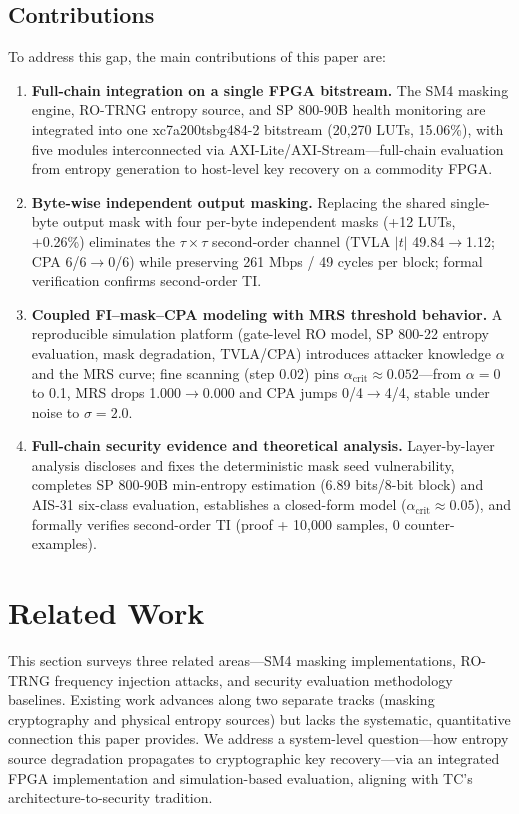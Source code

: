\documentclass[journal]{IEEEtran}
\begin{document}
\subsection{Contributions}

To address this gap, the main contributions of this paper are:

\begin{enumerate}
\item \textbf{Full-chain integration on a single FPGA bitstream.} The SM4 masking engine, RO-TRNG entropy source, and SP 800-90B health monitoring are integrated into one xc7a200tsbg484-2 bitstream (20,270 LUTs, 15.06\%), with five modules interconnected via AXI-Lite/AXI-Stream---full-chain evaluation from entropy generation to host-level key recovery on a commodity FPGA.
\item \textbf{Byte-wise independent output masking.} Replacing the shared single-byte output mask with four per-byte independent masks (+12 LUTs, +0.26\%) eliminates the $\tau\times\tau$ second-order channel (TVLA $|t|$ 49.84$\rightarrow$1.12; CPA 6/6$\rightarrow$0/6) while preserving 261 Mbps / 49 cycles per block; formal verification confirms second-order TI.
\item \textbf{Coupled FI--mask--CPA modeling with MRS threshold behavior.} A reproducible simulation platform (gate-level RO model, SP 800-22 entropy evaluation, mask degradation, TVLA/CPA) introduces attacker knowledge $\alpha$ and the MRS curve; fine scanning (step 0.02) pins $\alpha_{\text{crit}} \approx 0.052$---from $\alpha=0$ to 0.1, MRS drops 1.000$\rightarrow$0.000 and CPA jumps 0/4$\rightarrow$4/4, stable under noise to $\sigma=2.0$.
\item \textbf{Full-chain security evidence and theoretical analysis.} Layer-by-layer analysis discloses and fixes the deterministic mask seed vulnerability, completes SP 800-90B min-entropy estimation (6.89 bits/8-bit block) and AIS-31 six-class evaluation, establishes a closed-form model ($\alpha_{\text{crit}} \approx 0.05$), and formally verifies second-order TI (proof + 10,000 samples, 0 counter-examples).
\end{enumerate}

\section{Related Work}

This section surveys three related areas---SM4 masking implementations, RO-TRNG frequency injection attacks, and security evaluation methodology baselines. Existing work advances along two separate tracks (masking cryptography and physical entropy sources) but lacks the systematic, quantitative connection this paper provides. We address a system-level question---how entropy source degradation propagates to cryptographic key recovery---via an integrated FPGA implementation and simulation-based evaluation, aligning with TC's architecture-to-security tradition.
\end{document}
